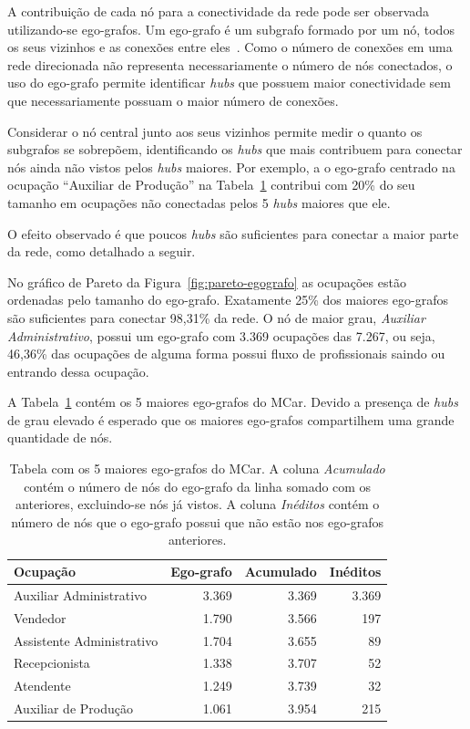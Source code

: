 \documentclass[12pt,a4paper]{article}
\begin{document}
A contribuição de cada nó para a conectividade da rede pode ser observada utilizando-se ego-grafos. Um ego-grafo é um subgrafo formado por um nó, todos os seus vizinhos e as conexões entre eles~\cite{Newman2010-od}. Como o número de conexões em uma rede direcionada não representa necessariamente o número de nós conectados, o uso do ego-grafo permite identificar \textit{hubs} que possuem maior conectividade sem que necessariamente possuam o maior número de conexões.

Considerar o nó central junto aos seus vizinhos permite medir o quanto os subgrafos se sobrepõem, identificando os \textit{hubs} que mais contribuem para conectar nós ainda não vistos pelos \textit{hubs} maiores. Por exemplo, a o ego-grafo centrado na ocupação \enquote{Auxiliar de Produção} na Tabela~\ref{tab:top-egografos} contribui com 20\% do seu tamanho em ocupações não conectadas pelos 5 \textit{hubs} maiores que ele.

O efeito observado é que poucos \textit{hubs} são suficientes para conectar a maior parte da rede, como detalhado a seguir.

No gráfico de Pareto da Figura~\ref{fig:pareto-egografo} as ocupações estão ordenadas pelo tamanho do ego-grafo. Exatamente 25\% dos maiores ego-grafos são suficientes para conectar 98,31\% da rede. O nó de maior grau, \textit{Auxiliar Administrativo}, possui um ego-grafo com 3.369 ocupações das 7.267, ou seja, 46,36\% das ocupações de alguma forma possui fluxo de profissionais saindo ou entrando dessa ocupação.

A Tabela~\ref{tab:top-egografos} contém os 5 maiores ego-grafos do MCar. Devido a presença de \textit{hubs} de grau elevado é esperado que os maiores ego-grafos compartilhem uma grande quantidade de nós.

\begin{table}[ht]
    \centering
    \begin{tabular}{@{} l r r r @{}}
        \toprule
        Ocupação                  & Ego-grafo & Acumulado & Inéditos \\
        \midrule
        Auxiliar Administrativo   & 3.369    & 3.369     & 3.369    \\
        Vendedor                  & 1.790    & 3.566     & 197      \\
        Assistente Administrativo & 1.704    & 3.655     & 89       \\
        Recepcionista                & 1.338    & 3.707     & 52       \\
        Atendente                      & 1.249    & 3.739     & 32       \\
        Auxiliar de Produção      & 1.061    & 3.954     & 215      \\
        \bottomrule
    \end{tabular}
    \caption{Tabela com os 5 maiores ego-grafos do MCar. A coluna \textit{Acumulado} contém o número de nós do ego-grafo da linha somado com os anteriores, excluindo-se nós já vistos. A coluna \textit{Inéditos} contém o número de nós que o ego-grafo possui que não estão nos ego-grafos anteriores.}
    \label{tab:top-egografos}
\end{table}
\end{document}
